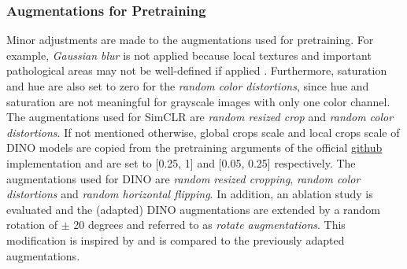 \subsubsection{Augmentations for Pretraining}
\label{section: augmentations for pretraining}
Minor adjustments are made to the augmentations used for pretraining.
For example, \textit{Gaussian blur} is not applied because local textures and important pathological areas may not be well-defined if applied \citep{Azizi2021}.
Furthermore, saturation and hue are also set to zero for the \textit{random color distortions}, since hue and saturation are not meaningful for grayscale images with only one color channel.
The augmentations used for SimCLR are \textit{random resized crop} and \textit{random color distortions}.
If not mentioned otherwise, global crops scale and local crops scale of DINO models are copied from the pretraining arguments of the official \href{https://github.com/facebookresearch/dino#pretrained-models}{github} implementation and are set to [0.25, 1] and [0.05, 0.25] respectively. 
The augmentations used for DINO are \textit{random resized cropping}, \textit{random color distortions} and \textit{random horizontal flipping}.
In addition, an ablation study is evaluated and the (adapted) DINO augmentations are extended by a random rotation of $\pm$ 20 degrees and referred to as \textit{rotate augmentations}. 
This modification is inspired by \citep{Azizi2021} and is compared to the previously adapted augmentations.
\par
